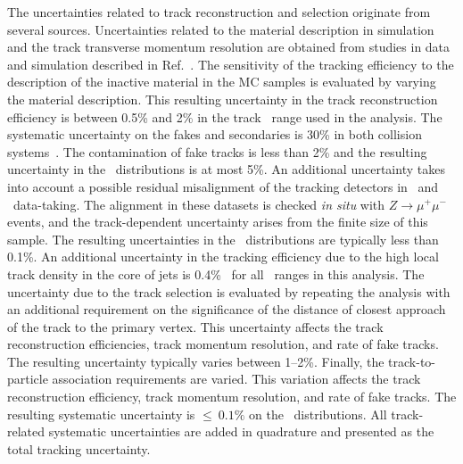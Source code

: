 The uncertainties related to track reconstruction and selection originate from several sources.
Uncertainties related to the material description in simulation and the track transverse 
momentum resolution are obtained from studies in data and simulation described in Ref.~\cite{ATL-PHYS-PUB-2015-051}.
The sensitivity of the tracking efficiency to the description of the 
inactive material in the MC samples is evaluated by varying the material description.
This resulting uncertainty in the track reconstruction efficiency is between
0.5\% and 2\% in the track \pT\ range used in the analysis. 
The systematic uncertainty on the fakes and secondaries is 30\% in both collision systems~\cite{ATL-PHYS-PUB-2015-051}.  The contamination of fake tracks is less than 2\% and the resulting uncertainty in the \Dptr\ distributions is at most 5\%.
An additional uncertainty takes into account a possible residual misalignment of the tracking detectors
in \pp\ and \PbPb\ data-taking. The alignment in these datasets is checked \textit{in situ} with $Z\rightarrow \mu^{+}\mu^{-}$ events, and the track-\pT\-dependent uncertainty arises from the finite size of this sample. The resulting uncertainties in
the \Dptr\ distributions are typically less than 0.1\%. An additional  uncertainty in the tracking efficiency due to the high local track density in the core of jets is 0.4\%~\cite{ATL-PHYS-PUB-2016-007} for all \ptjet\ ranges in this analysis. The uncertainty due to the track selection is evaluated by repeating the analysis with an additional requirement on the significance of the distance of closest approach of the track to the primary vertex. This uncertainty affects 
the track reconstruction efficiencies, track momentum resolution, and rate of fake tracks. The resulting uncertainty typically varies between 1--2\%.
Finally, the track-to-particle association requirements are varied. This variation affects the track reconstruction efficiency, track momentum resolution, and rate of fake tracks. The resulting systematic uncertainty is $\leq~0.1 \%$ on the \Dptr\ distributions. All track-related systematic uncertainties are added in quadrature and presented as the total tracking uncertainty. 

